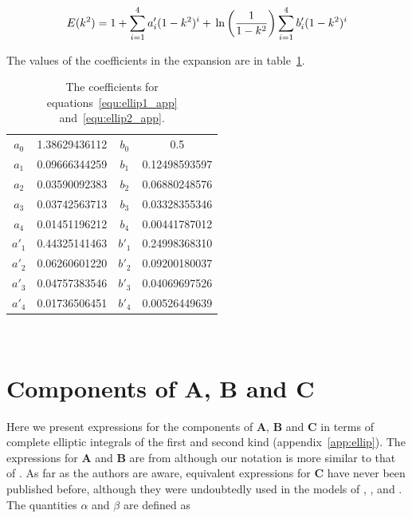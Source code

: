 \documentclass[12pt]{article}
\begin{document}
\begin{equation}
\label{equ:ellip2_app}
E(k^{2}) = 1 + \sum_{i = 1}^{4} a'_{i} (1 - k^{2})^{i} + \\\ln\left(\frac{1}{1 - k^{2}} \right) \sum_{i = 1}^{4} b'_{i} (1 - k^{2})^{i}
\end{equation}

The values of the coefficients in the expansion are in table~\ref{tab:ellip_poly_coeff}.

\begin{table}
\caption{\label{tab:ellip_poly_coeff} The coefficients for equations~\ref{equ:ellip1_app} and~\ref{equ:ellip2_app}.}
\begin{center}
\begin{tabular}{|c|c|c|c|}
\hline
$a_{0}$ & 1.38629436112 & $b_{0}$ & 0.5 \\
$a_{1}$ & 0.09666344259 & $b_{1}$ & 0.12498593597 \\
$a_{2}$ & 0.03590092383 & $b_{2}$ & 0.06880248576 \\
$a_{3}$ & 0.03742563713 & $b_{3}$ & 0.03328355346 \\
$a_{4}$ & 0.01451196212 & $b_{4}$ & 0.00441787012 \\
\hline
$a'_{1}$ & 0.44325141463 & $b'_{1}$ & 0.24998368310 \\
$a'_{2}$ & 0.06260601220 & $b'_{2}$ & 0.09200180037 \\
$a'_{3}$ & 0.04757383546 & $b'_{3}$ & 0.04069697526 \\
$a'_{4}$ & 0.01736506451 & $b'_{4}$ & 0.00526449639 \\
\hline
\end{tabular}
\end{center} 
\end{table}

\section{Components of $\boldsymbol{A}$, $\boldsymbol{B}$ and $\boldsymbol{C}$}
\label{app:mat_A}

Here we present expressions for the components of $\boldsymbol{A}$, $\boldsymbol{B}$ and $\boldsymbol{C}$ in terms of complete elliptic integrals of the first and second kind (appendix~\ref{app:ellip}). The expressions for $\boldsymbol{A}$ and $\boldsymbol{B}$ are from \citet{Graziani89} although our notation is more similar to that of \citet{Manga94}. As far as the authors are aware, equivalent expressions for $\boldsymbol{C}$ have never been published before, although they were undoubtedly used in the models of \citet{Lee82}, \citet{Geller86}, \citet{Manga95} and \citet{Roumeliotis00}. The quantities $\alpha$ and $\beta$ are defined as \citep{Manga94}
\end{document}
